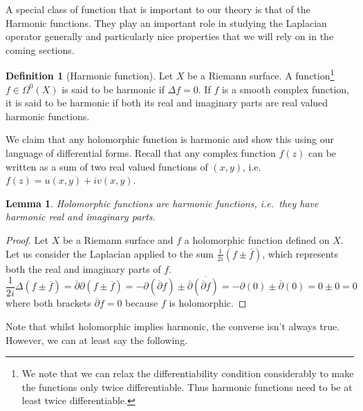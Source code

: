 \documentclass[11pt]{report}
\newtheorem{lemma}[thm]{Lemma}
\theoremstyle{definition}
\newtheorem{defn}[thm]{Definition}
\begin{document}
A special class of function that is important to our theory is that of the 
Harmonic functions. They play an important role in studying the Laplacian operator generally and particularly nice properties that we will rely on in the coming sections.
\begin{defn}[Harmonic function]\label{HarmonicDef}
  Let $X$ be a Riemann surface. A function\footnote{We note that we can relax the differentiability condition considerably to make the functions only twice differentiable. Thus harmonic functions need to be at least twice differentiable.} $f\in \Omega^0(X)$ is said to be harmonic if $\Delta f = 0$. If $f$ is a smooth complex function, it is said to be harmonic if both its real and imaginary parts are real valued harmonic functions.
\end{defn}
We claim that any holomorphic function is harmonic and show this using our language of differential forms. Recall that any complex function $f(z)$ can be written as a sum of two real valued functions of $(x,y)$, i.e.\ $f(z)=u(x,y)+iv(x,y)$.
\begin{lemma}\label{HolIsHarm}
  Holomorphic functions are harmonic functions, i.e.\ they have harmonic real and imaginary parts. 
\end{lemma} 
\begin{proof}
  Let $X$ be a Riemann surface and $f$ a holomorphic function defined on $X$.
  Let us consider the Laplacian applied to the sum $\frac{1}{2i}(f \pm \overline{f})$, which represents both the real and imaginary parts of $f$.
  \[\frac{1}{2i}\Delta(f \pm \overline{f}) = \overline{\partial}\partial(f \pm \overline{f})=-\partial(\overline{\partial}f) \pm \overline{\partial}\overline{(\overline{\partial}f)}=-\partial(0) \pm \overline{\partial}(0) = 0 \pm 0 = 0\]
  where both brackets $\overline{\partial} f = 0$ because $f$ is holomorphic.
\end{proof}

Note that whilst holomorphic implies harmonic, the converse isn't always true. However, we can at least say the following.
\end{document}
